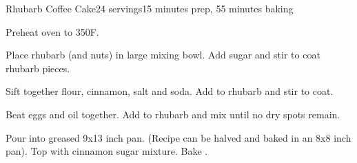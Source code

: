 \documentclass[../Cookbook.tex]{subfiles}
\begin{document}
\begin{recipe}{Rhubarb Coffee Cake}{24 servings}{15 minutes prep, 55 minutes baking}

	Preheat oven to 350\0F.

	Place rhubarb (and nuts) in large mixing bowl.  Add sugar and stir to coat rhubarb pieces.

	Sift together flour, cinnamon, salt and soda.  Add to rhubarb and stir to coat.

	Beat eggs and oil together.  Add to rhubarb and mix until no dry spots remain.

	Pour into greased 9x13 inch pan. (Recipe can be halved and baked in an 8x8 inch pan). Top with cinnamon sugar mixture. Bake .
\end{recipe}
\end{document}
